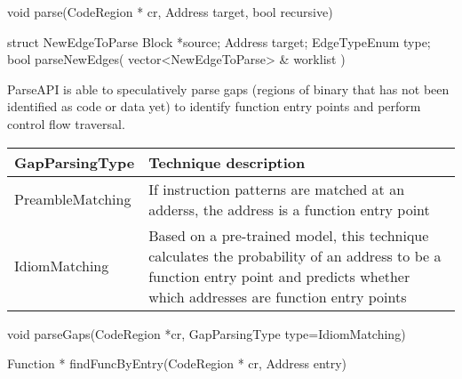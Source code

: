 \begin{apient}
void parse(CodeRegion * cr,
           Address target,
           bool recursive)
\end{apient}

\begin{apient}
struct NewEdgeToParse {
    Block *source;
    Address target;
    EdgeTypeEnum type;
}
bool parseNewEdges( vector<NewEdgeToParse> & worklist )
\end{apient}

ParseAPI is able to speculatively parse gaps 
(regions of binary that has not been identified as code or data yet)
to identify function entry points and
perform control flow traversal.

\begin{center}
\begin{tabular}{lp{10cm}}
\toprule
GapParsingType & Technique description \\
\midrule
PreambleMatching & If instruction patterns are matched at an adderss, the address is a function entry point  \\
IdiomMatching & Based on a pre-trained model, this technique calculates the probability of an address to be a function entry point and predicts whether which addresses are function entry points\\
\bottomrule
\end{tabular}
\end{center}

\begin{apient}
void parseGaps(CodeRegion *cr,
               GapParsingType type=IdiomMatching)
\end{apient}

\begin{apient}
Function * findFuncByEntry(CodeRegion * cr,
                           Address entry)
\end{apient}

